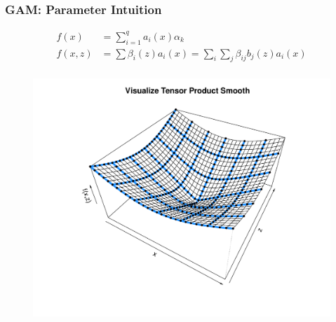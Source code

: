 \documentclass{beamer}
\begin{document}
\begin{frame}
\frametitle{GAM: Parameter Intuition}

\small{
\begin{align*}
 f(x)&=\sum \limits_{i=1}^q a_i(x) \alpha_k\\
f(x,z)&= \sum \beta_i(z) a_i(x) = \sum_i \sum_j \beta_{ij} b_j(z) a_i(x) \\
\end{align*}}
\vspace{-.3in}
\begin{figure}
\includegraphics[scale=.25]{figures/tensorProductViz}

\end{figure}

\end{frame}
\end{document}
